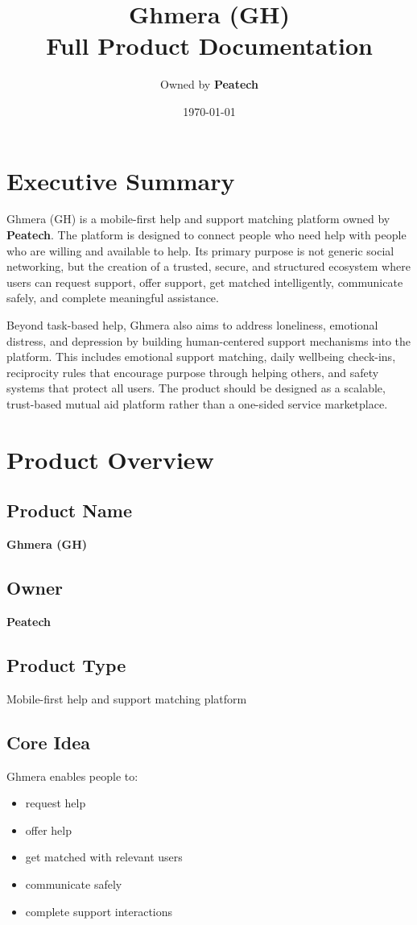 \documentclass[11pt]{article}
\title{\textbf{Ghmera (GH)}\\Full Product Documentation}
\author{Owned by \textbf{Peatech}}
\date{\today}
\begin{document}
\maketitle
\tableofcontents
\newpage

\section{Executive Summary}

Ghmera (GH) is a mobile-first help and support matching platform owned by \textbf{Peatech}. The platform is designed to connect people who need help with people who are willing and available to help. Its primary purpose is not generic social networking, but the creation of a trusted, secure, and structured ecosystem where users can request support, offer support, get matched intelligently, communicate safely, and complete meaningful assistance.

Beyond task-based help, Ghmera also aims to address loneliness, emotional distress, and depression by building human-centered support mechanisms into the platform. This includes emotional support matching, daily wellbeing check-ins, reciprocity rules that encourage purpose through helping others, and safety systems that protect all users. The product should be designed as a scalable, trust-based mutual aid platform rather than a one-sided service marketplace.

\section{Product Overview}

\subsection{Product Name}
\textbf{Ghmera (GH)}

\subsection{Owner}
\textbf{Peatech}

\subsection{Product Type}
Mobile-first help and support matching platform

\subsection{Core Idea}
Ghmera enables people to:
\begin{itemize}[leftmargin=1.5em]
    \item request help
    \item offer help
    \item get matched with relevant users
    \item communicate safely
    \item complete support interactions
\end{itemize}
\end{document}
